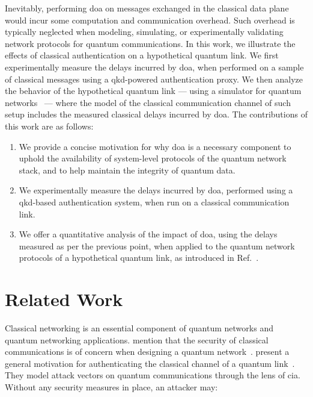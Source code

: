 Inevitably, performing \acrshort{doa} on messages exchanged in the classical data plane would incur
some computation and communication overhead. Such overhead is typically neglected when modeling,
simulating, or experimentally validating network protocols for quantum communications. In this work,
we illustrate the effects of classical authentication on a hypothetical quantum link. We first
experimentally measure the delays incurred by \acrshort{doa}, when performed on a sample of
classical messages using a \acrshort{qkd}-powered authentication proxy. We then analyze the behavior
of the hypothetical quantum link --- using a simulator for quantum
networks~\cite{coopmans_2021_netsquid} --- where the model of the classical communication channel of
such setup includes the measured classical delays incurred by \acrshort{doa}. The contributions of
this work are as follows:

\begin{enumerate}
    \item We provide a concise motivation for why \acrshort{doa} is a necessary component to uphold
          the availability of system-level protocols of the quantum network stack, and to help
          maintain the integrity of quantum data.
    \item We experimentally measure the delays incurred by \acrshort{doa}, performed using a
          \acrshort{qkd}-based authentication system, when run on a classical communication link.
    \item We offer a quantitative analysis of the impact of \acrshort{doa}, using the delays
          measured as per the previous point, when applied to the quantum network protocols of a
          hypothetical quantum link, as introduced in Ref.~\cite{dahlberg_2019_egp}.
\end{enumerate}

\section{Related Work}
\label{sec:doa:relwork}

Classical networking is an essential component of quantum networks and quantum networking
applications. \citeauthor{kozlowski_2019_towards} mention that the security of classical
communications is of concern when designing a quantum network~\cite{kozlowski_2019_towards}.
\citeauthor{satoh_2020_attacking} present a general motivation for authenticating the classical
channel of a quantum link~\cite{satoh_2020_attacking}. They model attack vectors on quantum
communications through the lens of \acrfull{cia}. Without any security measures in place, an
attacker may:

